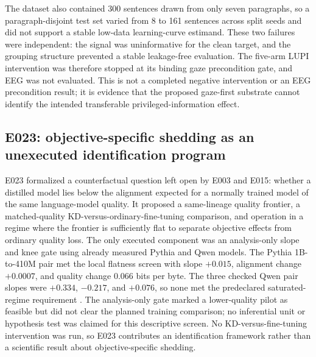 The dataset also contained 300 sentences drawn from only seven paragraphs, so a paragraph-disjoint test set varied from 8 to 161 sentences across split seeds and did not support a stable low-data learning-curve estimand.
These two failures were independent: the signal was uninformative for the clean target, and the grouping structure prevented a stable leakage-free evaluation.
The five-arm LUPI intervention was therefore stopped at its binding gaze precondition gate, and EEG was not evaluated.
This is not a completed negative intervention or an EEG precondition result; it is evidence that the proposed gaze-first substrate cannot identify the intended transferable privileged-information effect.

\subsection{E023: objective-specific shedding as an unexecuted identification program}
\label{sec:e023-detail}

E023 formalized a counterfactual question left open by E003 and E015: whether a distilled model lies below the alignment expected for a normally trained model of the same language-model quality.
It proposed a same-lineage quality frontier, a matched-quality KD-versus-ordinary-fine-tuning comparison, and operation in a regime where the frontier is sufficiently flat to separate objective effects from ordinary quality loss.
The only executed component was an analysis-only slope and knee gate using already measured Pythia and Qwen models.
The Pythia 1B-to-410M pair met the local flatness screen with slope $+0.015$, alignment change $+0.0007$, and quality change $0.066$ bits per byte. 
The three checked Qwen pair slopes were $+0.334$, $-0.217$, and $+0.076$, so none met the predeclared saturated-regime requirement .
The analysis-only gate marked a lower-quality pilot as feasible but did not clear the planned training comparison; no inferential unit or hypothesis test was claimed for this descriptive screen.
No KD-versus-fine-tuning intervention was run, so E023 contributes an identification framework rather than a scientific result about objective-specific shedding.
